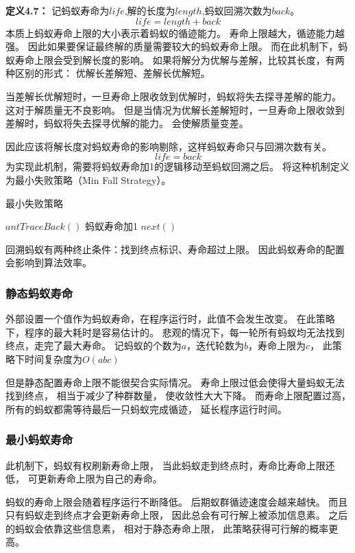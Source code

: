 \textbf{定义4.7}\textbf{：}
记蚂蚁寿命为$life$,解的长度为$length$,蚂蚁回溯次数为$back$。
$$
	life=length+back
$$
本质上蚂蚁寿命上限的大小表示着蚂蚁的循迹能力。
寿命上限越大，循迹能力越强。
因此如果要保证最终解的质量需要较大的蚂蚁寿命上限。
而在此机制下，蚂蚁寿命上限会受到解长度的影响。
如果将解分为优解与差解，比较其长度，有两种区别的形式：
优解长差解短、差解长优解短。

当差解长优解短时，一旦寿命上限收敛到优解时，蚂蚁将失去探寻差解的能力。
这对于解质量无不良影响。
但是当情况为优解长差解短时，一旦寿命上限收敛到差解时，蚂蚁将失去探寻优解的能力。
会使解质量变差。

因此应该将解长度对蚂蚁寿命的影响剔除，这样蚂蚁寿命只与回溯次数有关。
$$
	life=back
$$
为实现此机制，需要将蚂蚁寿命加1的逻辑移动至蚂蚁回溯之后。
将这种机制定义为最小失败策略（Min Fall Strategy）。
\begin{algorithm}[H]
	\caption{最小失败策略}
	\label{alg4-14}
	\begin{algorithmic}
					\State $antTraceBack()$
					\State 蚂蚁寿命加1
				\EndWhile
				\State $next()$
			\EndWhile
		\EndProcedure
	\end{algorithmic}
\end{algorithm}

回溯蚂蚁有两种终止条件：找到终点标识、寿命超过上限。
因此蚂蚁寿命的配置会影响到算法效率。

\subsubsection{静态蚂蚁寿命}
外部设置一个值作为蚂蚁寿命，在程序运行时，此值不会发生改变。
在此策略下，程序的最大耗时是容易估计的。
悲观的情况下，每一轮所有蚂蚁均无法找到终点，走完了最大寿命。
记蚂蚁的个数为$a$，迭代轮数为$b$，寿命上限为$c$，
此策略下时间复杂度为$O(abc)$

但是静态配置寿命上限不能很契合实际情况。
寿命上限过低会使得大量蚂蚁无法找到终点，
相当于减少了种群数量，
使收敛性大大下降。
而寿命上限配置过高，所有的蚂蚁都需等待最后一只蚂蚁完成循迹，
延长程序运行时间。
\subsubsection{最小蚂蚁寿命}
此机制下，蚂蚁有权刷新寿命上限，
当此蚂蚁走到终点时，寿命比寿命上限还低，
可更新寿命上限为自己的寿命。

蚂蚁的寿命上限会随着程序运行不断降低。
后期蚁群循迹速度会越来越快。
而且只有蚂蚁走到终点才会更新寿命上限，
因此总会有可行解上被添加信息素。
之后的蚂蚁会依靠这些信息素，
相对于静态寿命上限，
此策略获得可行解的概率更高。


